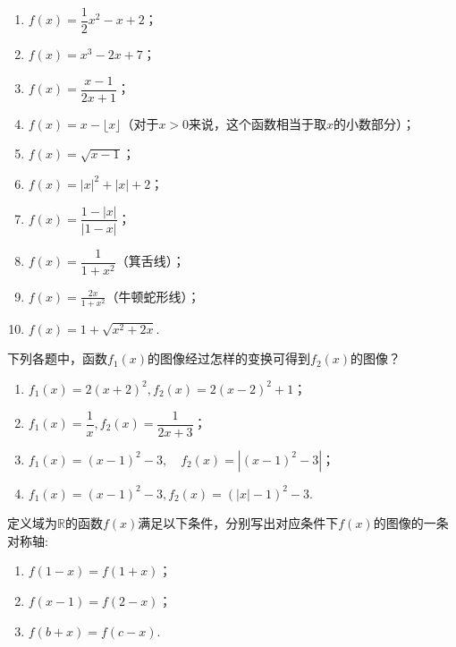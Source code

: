 \documentclass[lang=cn,math=cm,chinesefont=nofont,11pt,scheme=chinese,twocol]{elegantbook}
\begin{document}
\begin{spacing}{1.8}
  \begin{enumerate}\label{exer:FunctionGraph}
    \item $f(x)=\dfrac12 x^2-x+2$；
    \item $f(x)=x^3-2x+7$；
    \item $f(x)=\dfrac{x-1}{2x+1}$；
    \item $f(x)=x-\lfloor x\rfloor$（对于$x>0$来说，这个函数相当于取$x$的小数部分）；
    \item $f(x)=\sqrt{x-1}$；
    \item $f(x)=\left|x\right|^2+\left|x\right|+2$；
    \item $f(x)=\dfrac{1-\left|x\right|}{\left|1-x\right|}$；
    \item $f(x)=\dfrac{1}{1+x^2}$（箕舌线）；
    \item $f(x)=\frac{2x}{1+x^2}$（牛顿蛇形线）；
    \item $f(x)=1+\sqrt{x^{2}+2x}$.
  \end{enumerate}
\end{spacing}

\begin{exercise}\label{BJSZ.Algebra1.P58-59.changed}
  下列各题中，函数$f_1(x)$的图像经过怎样的变换可得到$f_2(x)$的图像？
\end{exercise}

\begin{spacing}{1.7}
  \begin{enumerate}
    \item $f_{1}(x)=2(x+2)^{2}, f_{2}(x)=2(x-2)^{2}+1$；
    \item $f_{1}(x)=\dfrac{1}{x}, f_{2}(x)=\dfrac{1}{2x+3}$；
    \item $f_{1}\left(x\right)=\left(x-1\right)^{2}-3,\quad f_{2}\left(x\right)=\left|\left(x-1\right)^{2}-3\right|$；
    \item $f_{1}(x)=(x-1)^{2}-3,f_{2}(x)=(|x|-1)^{2}-3$.
  \end{enumerate}
\end{spacing}

\begin{exercise}
  定义域为$\mathbb{R}$的函数$f(x)$满足以下条件，分别写出对应条件下$f(x)$的图像的一条对称轴:
\end{exercise}

\begin{enumerate}
  \item $f(1-x)=f(1+x)$；
  \item $f(x-1)=f(2-x)$；
  \item $f(b+x)=f(c-x)$.
\end{enumerate}
\end{document}
